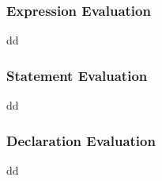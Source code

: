 \subsubsection{Expression Evaluation}
dd

\subsubsection{Statement Evaluation}
dd

\subsubsection{Declaration Evaluation}
dd












